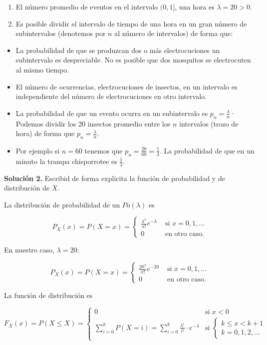 \documentclass[
  letterpaper,
  DIV=11,
  numbers=noendperiod]{scrreprt}
\providecommand{\tightlist}{%
  \setlength{\itemsep}{0pt}\setlength{\parskip}{0pt}}\usepackage{longtable,booktabs,array}
\begin{document}
\begin{enumerate}
\def\labelenumi{\arabic{enumi}.}
\tightlist
\item
  El número promedio de eventos en el intervalo \((0,1]\), una hora es
  \(\lambda=20>0\).
\item
  Es posible dividir el intervalo de tiempo de una hora en un gran
  número de subintervalos (denotemos por \(n\) al número de intervalos)
  de forma que:
\end{enumerate}

\begin{itemize}
\tightlist
\item
  La probabilidad de que se produzcan dos o más electrocuciones un
  subintervalo es despreciable. No es posible que dos mosquitos se
  electrocuten al mismo tiempo.
\item
  El número de ocurrencias, electrocuciones de insectos, en un intervalo
  es independiente del número de electrocuciones en otro intervalo.
\item
  La probabilidad de que un evento ocurra en un subintervalo es
  \(p_n=\frac{\lambda}{n}\)· Podemos dividir los 20 insectos promedio
  entre los \(n\) intervalos (trozo de hora) de forma que
  \(p_n=\frac{\lambda}{n}\).
\item
  Por ejemplo si \(n=60\) tenemos que \(p_n=\frac{20}{60}=\frac{1}{3}\).
  La probabilidad de que en un minuto la trampa chisporrotee es
  \(\frac{1}{3}\).
\end{itemize}

\textbf{Solución 2.} Escribid de forma explicita la función de
probabilidad y de distribución de \(X\).

La distribución de probabilidad de un \(Po(\lambda)\) es

\[
P_X(x)=P(X=x)=\left\{\begin{array}{ll} \frac{\lambda^x}{x!}e^{-\lambda} & \mbox{ si } x=0,1,\ldots\\ 0 & \mbox{ en otro caso.}\end{array}\right.
\]

En nuestro caso, \(\lambda =20\):

\[
P_X(x)=P(X=x)=\left\{\begin{array}{ll}\frac{20^x}{x!}e^{-20} & \mbox{ si } x=0,1,\ldots\\ 0 & \mbox{ en otro caso.}\end{array}\right.
\]

La función de distribución es

\[
F_X(x)=P(X\leq X)=
\left\{\begin{array}{ll} 
0 & \mbox{si } x<0\\
\displaystyle\sum_{i=0}^{k} P(X=i)=\sum_{i=0}^{k}\frac{\lambda^i}{i!}\cdot e^{-\lambda} & \mbox{si }
\left\{\begin{array}{l}
k\leq x< k+1\\k=0,1,2,\ldots
\end{array}
\right.
\end{array}
\right.
\]
\end{document}
